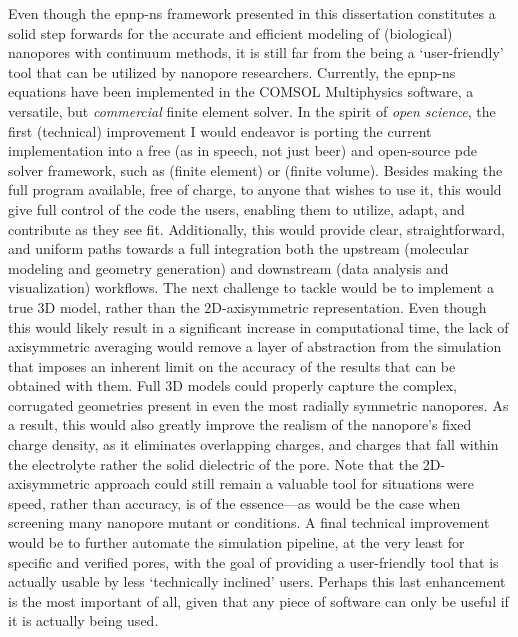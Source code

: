 Even though the \gls{epnp-ns} framework presented in this dissertation constitutes a solid step forwards for
the accurate and efficient modeling of (biological) nanopores with continuum methods, it is still far from the
being a `user-friendly' tool that can be utilized by nanopore researchers. Currently, the \gls{epnp-ns}
equations have been implemented in the COMSOL Multiphysics software, a versatile, but \emph{commercial} finite
element solver. In the spirit of \emph{open science}, the first (technical) improvement I would endeavor is
porting the current implementation into a free (as in speech, not just beer) and open-source \gls{pde} solver
framework, such as  (finite element) or  (finite volume). Besides making the full
program available, free of charge, to anyone that wishes to use it, this would give full control of the code
the users, enabling them to utilize, adapt, and contribute as they see fit. Additionally, this would provide
clear, straightforward, and uniform paths towards a full integration both the upstream (molecular modeling and
geometry generation) and downstream (data analysis and visualization) workflows. The next challenge to tackle
would be to implement a true 3D model, rather than the 2D-axisymmetric representation. Even though this would
likely result in a significant increase in computational time, the lack of axisymmetric averaging would remove
a layer of abstraction from the simulation that imposes an inherent limit on the accuracy of the results that
can be obtained with them. Full 3D models could properly capture the complex, corrugated geometries present in
even the most radially symmetric nanopores. As a result, this would also greatly improve the realism of the
nanopore's fixed charge density, as it eliminates overlapping charges, and charges that fall within the
electrolyte rather the solid dielectric of the pore. Note that the 2D-axisymmetric approach could still remain
a valuable tool for situations were speed, rather than accuracy, is of the essence---as would be the case when
screening many nanopore mutant or conditions. A final technical improvement would be to further automate the
simulation pipeline, at the very least for specific and verified pores, with the goal of providing a
user-friendly tool that is actually usable by less `technically inclined' users.\footnotemark%
%
%
Perhaps this last enhancement is the most important of all, given that any piece of software can only be
useful if it is actually being used.


